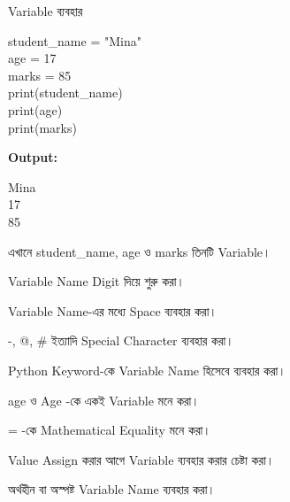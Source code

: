 \begin{examplebox}{Variable ব্যবহার}

\begin{codebox}

\begin{english}
\ttfamily
student\_name = "Mina"\\
age = 17\\
marks = 85\\[1mm]
print(student\_name)\\
print(age)\\
print(marks)
\end{english}

\end{codebox}

\textbf{Output:}

\begin{codebox}

\begin{english}
\ttfamily
Mina\\
17\\
85
\end{english}

\end{codebox}

এখানে
\textenglish{\ttfamily student\_name},
\textenglish{\ttfamily age}
ও
\textenglish{\ttfamily marks}
তিনটি Variable।

\end{examplebox}




\begin{compacttwocolpoints}

\item Variable Name Digit দিয়ে শুরু করা।

\item Variable Name-এর মধ্যে Space ব্যবহার করা।

\item
\textenglish{\ttfamily -},
\textenglish{\ttfamily @},
\textenglish{\ttfamily \#}
ইত্যাদি Special Character ব্যবহার করা।

\item Python Keyword-কে Variable Name হিসেবে ব্যবহার করা।

\item
\textenglish{\ttfamily age}
ও
\textenglish{\ttfamily Age}
-কে একই Variable মনে করা।

\item
\textenglish{\ttfamily =}
-কে Mathematical Equality মনে করা।

\item Value Assign করার আগে Variable ব্যবহার করার চেষ্টা করা।

\item অর্থহীন বা অস্পষ্ট Variable Name ব্যবহার করা।

\end{compacttwocolpoints}

